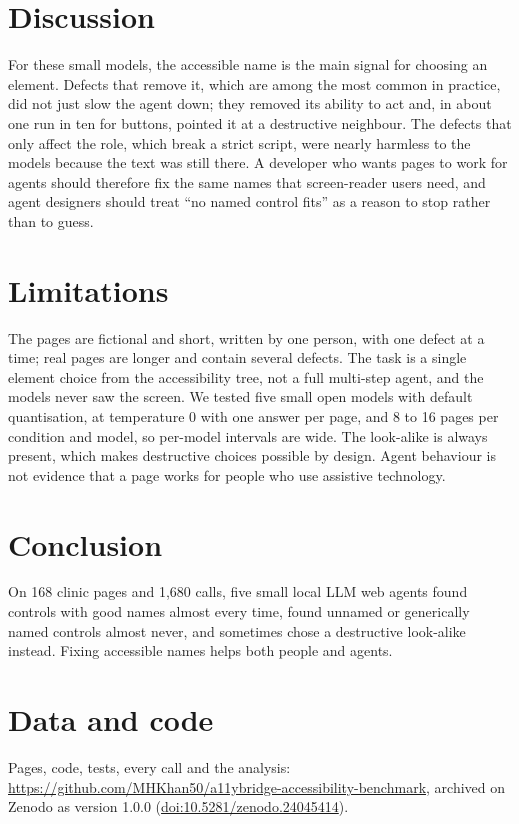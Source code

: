 \documentclass[11pt]{article}
\begin{document}
\section{Discussion}
For these small models, the accessible name is the main signal for choosing an element. Defects that remove it, which are among the most common in practice, did not just slow the agent down; they removed its ability to act and, in about one run in ten for buttons, pointed it at a destructive neighbour. The defects that only affect the role, which break a strict script, were nearly harmless to the models because the text was still there. A developer who wants pages to work for agents should therefore fix the same names that screen-reader users need, and agent designers should treat ``no named control fits'' as a reason to stop rather than to guess.

\section{Limitations}
The pages are fictional and short, written by one person, with one defect at a time; real pages are longer and contain several defects. The task is a single element choice from the accessibility tree, not a full multi-step agent, and the models never saw the screen. We tested five small open models with default quantisation, at temperature 0 with one answer per page, and 8 to 16 pages per condition and model, so per-model intervals are wide. The look-alike is always present, which makes destructive choices possible by design. Agent behaviour is not evidence that a page works for people who use assistive technology.

\section{Conclusion}
On 168 clinic pages and 1,680 calls, five small local LLM web agents found controls with good names almost every time, found unnamed or generically named controls almost never, and sometimes chose a destructive look-alike instead. Fixing accessible names helps both people and agents.

\section*{Data and code}
Pages, code, tests, every call and the analysis: \url{https://github.com/MHKhan50/a11ybridge-accessibility-benchmark}, archived on Zenodo as version 1.0.0 (\href{https://doi.org/10.5281/zenodo.24045414}{doi:10.5281/zenodo.24045414}).



\end{document}
